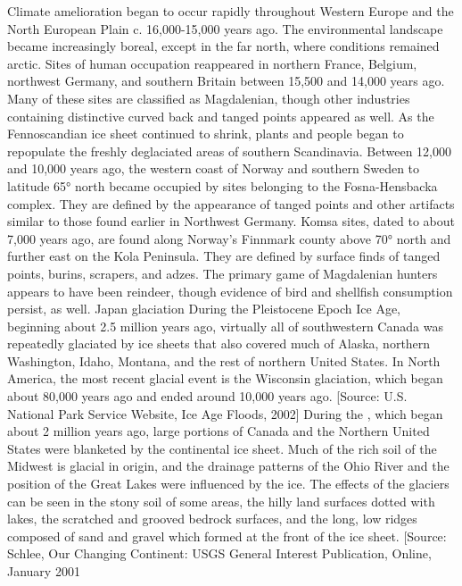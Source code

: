 		\ddd  Climate amelioration began to occur rapidly throughout Western Europe and the North European Plain c. 16,000-15,000 years ago. The environmental landscape became increasingly boreal, except in the far north, where conditions remained arctic. Sites of human occupation reappeared in northern France, Belgium, northwest Germany, and southern Britain between 15,500 and 14,000 years ago. Many of these sites are classified as Magdalenian, though other industries containing distinctive curved back and tanged points appeared as well. As the Fennoscandian ice sheet continued to shrink, plants and people began to repopulate the freshly deglaciated areas of southern Scandinavia.
		\ddd Between 12,000 and 10,000 years ago, the western coast of Norway and southern Sweden to latitude 65° north became occupied by sites belonging to the Fosna-Hensbacka complex. They are defined by the appearance of tanged points and other artifacts similar to those found earlier in Northwest Germany. Komsa sites, dated to about 7,000 years ago, are found along Norway's Finnmark county above 70° north and further east on the Kola Peninsula. They are defined by surface finds of tanged points, burins, scrapers, and adzes. The primary game of Magdalenian hunters appears to have been reindeer, though evidence of bird and shellfish consumption persist, as well.
		\ddd Japan glaciation During the Pleistocene Epoch Ice Age, beginning about 2.5 million years ago, virtually all of southwestern Canada was repeatedly glaciated by ice sheets that also covered much of Alaska, northern Washington, Idaho, Montana, and the rest of northern United States. In North America, the most recent glacial event is the Wisconsin glaciation, which began about 80,000 years ago and ended around 10,000 years ago. [Source: U.S. National Park Service Website, Ice Age Floods, 2002]
		\ddd During the , which began about 2 million years ago, large portions of Canada and the Northern United States were blanketed by the continental ice sheet. Much of the rich soil of the Midwest is glacial in origin, and the drainage patterns of the Ohio River and the position of the Great Lakes were influenced by the ice. The effects of the glaciers can be seen in the stony soil of some areas, the hilly land surfaces dotted with lakes, the scratched and grooved bedrock surfaces, and the long, low ridges composed of sand and gravel which formed at the front of the ice sheet. [Source: Schlee, Our Changing Continent: USGS General Interest Publication, Online, January 2001
